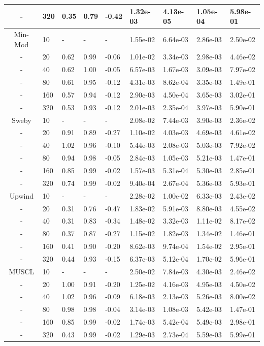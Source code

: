 \begin{table}[htbp]
{\begin{tabular}{cllllllll}
    - &  320 & 0.35 & 0.79 & -0.42 & 1.32e-03 & 4.13e-05 & 1.05e-04 & 5.98e-01 \\ 
   \hline
    Min-Mod &   10 & - & - & - & 1.55e-02 & 6.64e-03 & 2.86e-03 & 2.50e-02  \\
    - &   20 & 0.62 & 0.99 & -0.06 & 1.01e-02 & 3.34e-03 & 2.98e-03 & 4.46e-02 \\ 
    - &   40 & 0.62 & 1.00 & -0.05 & 6.57e-03 & 1.67e-03 & 3.09e-03 & 7.97e-02 \\ 
    - &   80 & 0.61 & 0.95 & -0.12 & 4.31e-03 & 8.62e-04 & 3.35e-03 & 1.49e-01 \\ 
    - &  160 & 0.57 & 0.94 & -0.12 & 2.90e-03 & 4.50e-04 & 3.65e-03 & 3.02e-01 \\ 
    - &  320 & 0.53 & 0.93 & -0.12 & 2.01e-03 & 2.35e-04 & 3.97e-03 & 5.90e-01 \\ 
   \hline
    Sweby &   10 & - & - & - & 2.08e-02 & 7.44e-03 & 3.90e-03 & 2.36e-02  \\
    - &   20 & 0.91 & 0.89 & -0.27 & 1.10e-02 & 4.03e-03 & 4.69e-03 & 4.61e-02 \\ 
    - &   40 & 1.02 & 0.96 & -0.10 & 5.44e-03 & 2.08e-03 & 5.03e-03 & 7.92e-02 \\ 
    - &   80 & 0.94 & 0.98 & -0.05 & 2.84e-03 & 1.05e-03 & 5.21e-03 & 1.47e-01 \\ 
    - &  160 & 0.85 & 0.99 & -0.02 & 1.57e-03 & 5.31e-04 & 5.30e-03 & 2.85e-01 \\ 
    - &  320 & 0.74 & 0.99 & -0.02 & 9.40e-04 & 2.67e-04 & 5.36e-03 & 5.93e-01 \\ 
   \hline
    Upwind &   10 & - & - & - & 2.28e-02 & 1.00e-02 & 6.33e-03 & 2.43e-02  \\
    - &   20 & 0.31 & 0.76 & -0.47 & 1.83e-02 & 5.91e-03 & 8.80e-03 & 4.55e-02 \\ 
    - &   40 & 0.31 & 0.83 & -0.34 & 1.48e-02 & 3.32e-03 & 1.11e-02 & 8.17e-02 \\ 
    - &   80 & 0.37 & 0.87 & -0.27 & 1.15e-02 & 1.82e-03 & 1.34e-02 & 1.46e-01 \\ 
    - &  160 & 0.41 & 0.90 & -0.20 & 8.62e-03 & 9.74e-04 & 1.54e-02 & 2.95e-01 \\ 
    - &  320 & 0.44 & 0.93 & -0.15 & 6.37e-03 & 5.12e-04 & 1.70e-02 & 5.96e-01 \\ 
   \hline
    MUSCL &   10 & - & - & - & 2.50e-02 & 7.84e-03 & 4.30e-03 & 2.46e-02  \\
    - &   20 & 1.00 & 0.91 & -0.20 & 1.25e-02 & 4.16e-03 & 4.95e-03 & 4.50e-02 \\ 
    - &   40 & 1.02 & 0.96 & -0.09 & 6.18e-03 & 2.13e-03 & 5.26e-03 & 8.00e-02 \\ 
    - &   80 & 0.98 & 0.98 & -0.04 & 3.14e-03 & 1.08e-03 & 5.42e-03 & 1.47e-01 \\ 
    - &  160 & 0.85 & 0.99 & -0.02 & 1.74e-03 & 5.42e-04 & 5.49e-03 & 2.98e-01 \\ 
    - &  320 & 0.43 & 0.99 & -0.02 & 1.29e-03 & 2.73e-04 & 5.59e-03 & 5.99e-01 \\ 
   \hline
   \end{tabular}
   }
\end{table}

